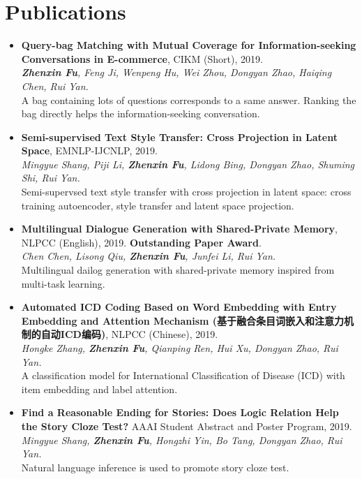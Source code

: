 \documentclass[letterpaper]{article}
\begin{document}
\section*{Publications}
\begin{itemize}


\item \textbf{Query-bag Matching with Mutual Coverage for Information-seeking Conversations in E-commerce}, CIKM (Short), 2019. \\
{\it \textbf{Zhenxin Fu}, Feng Ji, Wenpeng Hu, Wei Zhou, Dongyan Zhao, Haiqing Chen, Rui Yan. } \\
A bag containing lots of questions corresponds to a same answer. Ranking the bag directly helps the information-seeking conversation.

\item \textbf{Semi-supervised Text Style Transfer: Cross Projection in Latent Space}, EMNLP-IJCNLP, 2019. \\
{\it Mingyue Shang, Piji Li, \textbf{Zhenxin Fu}, Lidong Bing, Dongyan Zhao, Shuming Shi, Rui Yan.} \\
Semi-supervsed text style transfer with cross projection in latent space: cross training autoencoder, style transfer and latent space projection.

\item \textbf{Multilingual Dialogue Generation with Shared-Private Memory}, NLPCC (English), 2019. \textbf{Outstanding Paper Award}. \\
{\it Chen Chen, Lisong Qiu, \textbf{Zhenxin Fu}, Junfei Li, Rui Yan. } \\
Multilingual dailog generation with shared-private memory inspired from multi-task learning.

\item \textbf{Automated ICD Coding Based on Word Embedding with Entry Embedding and Attention Mechanism (基于融合条目词嵌入和注意力机制的自动ICD编码)}, NLPCC (Chinese), 2019. \\
{\it Hongke Zhang, \textbf{Zhenxin Fu}, Qianping Ren, Hui Xu, Dongyan Zhao, Rui Yan.} \\
A classification model for International Classification of Disease (ICD) with item embedding and label attention.

\item \textbf{Find a Reasonable Ending for Stories: Does Logic Relation Help the Story Cloze Test?} AAAI Student Abstract and Poster Program, 2019. \\
{\it Mingyue Shang, \textbf{Zhenxin Fu}, Hongzhi Yin, Bo Tang, Dongyan Zhao, Rui Yan.} \\
Natural language inference is used to promote story cloze test.


\end{itemize}
\end{document}
